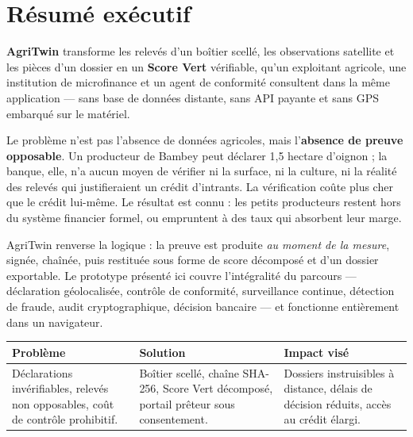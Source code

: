 \documentclass[12pt, a4paper]{article}
\begin{document}
\section{Résumé exécutif}

\begin{mdframed}[style=accent]
\textbf{AgriTwin} transforme les relevés d'un boîtier scellé, les observations
satellite et les pièces d'un dossier en un \textbf{Score Vert} vérifiable, qu'un
exploitant agricole, une institution de microfinance et un agent de conformité
consultent dans la même application — sans base de données distante, sans API
payante et sans GPS embarqué sur le matériel.
\end{mdframed}

\vspace{0.4cm}

Le problème n'est pas l'absence de données agricoles, mais l'\textbf{absence de preuve
opposable}. Un producteur de Bambey peut déclarer 1,5 hectare d'oignon ; la banque, elle,
n'a aucun moyen de vérifier ni la surface, ni la culture, ni la réalité des relevés qui
justifieraient un crédit d'intrants. La vérification coûte plus cher que le crédit
lui-même. Le résultat est connu : les petits producteurs restent hors du système financier
formel, ou empruntent à des taux qui absorbent leur marge.

AgriTwin renverse la logique : la preuve est produite \emph{au moment de la mesure},
signée, chaînée, puis restituée sous forme de score décomposé et d'un dossier exportable.
Le prototype présenté ici couvre l'intégralité du parcours — déclaration géolocalisée,
contrôle de conformité, surveillance continue, détection de fraude, audit cryptographique,
décision bancaire — et fonctionne entièrement dans un navigateur.

\vspace{0.5cm}

\begin{center}
\begin{tabular}{p{4.2cm} p{4.2cm} p{4.2cm}}
  \toprule
  \rowcolor{lightbg}
  \textbf{\textcolor{primary}{Problème}} &
  \textbf{\textcolor{primary}{Solution}} &
  \textbf{\textcolor{primary}{Impact visé}} \\
  \midrule
  Déclarations invérifiables, relevés non opposables, coût de contrôle prohibitif. &
  Boîtier scellé, chaîne SHA-256, Score Vert décomposé, portail prêteur sous consentement. &
  Dossiers instruisibles à distance, délais de décision réduits, accès au crédit élargi. \\
  \bottomrule
\end{tabular}
\end{center}
\end{document}
